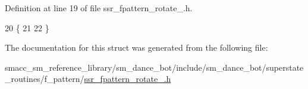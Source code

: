 Definition at line 19 of file ssr\+\_\+fpattern\+\_\+rotate\+\_.\+h.


\begin{DoxyCode}
20   \{
21     
22   \}
\end{DoxyCode}


The documentation for this struct was generated from the following file\+:\begin{DoxyCompactItemize}
\item 
smacc\+\_\+sm\+\_\+reference\+\_\+library/sm\+\_\+dance\+\_\+bot/include/sm\+\_\+dance\+\_\+bot/superstate\+\_\+routines/f\+\_\+pattern/\hyperlink{ssr__fpattern__rotate__1_8h}{ssr\+\_\+fpattern\+\_\+rotate\+\_.\+h}\end{DoxyCompactItemize}
